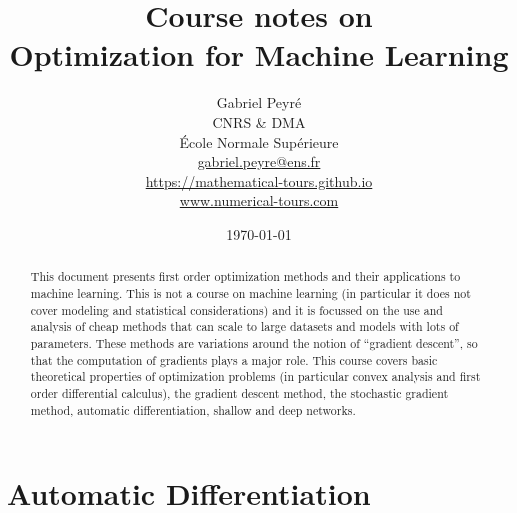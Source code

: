 \documentclass[10pt]{article}
\title{Course notes on\\Optimization for Machine Learning}
\author{%
\begin{tabular}{c}
	Gabriel Peyr{\'e} \\ CNRS \& DMA \\
	 \'Ecole Normale Sup\'erieure \\
	 \url{gabriel.peyre@ens.fr}\\
	 \url{https://mathematical-tours.github.io}\\
	 \url{www.numerical-tours.com}
\end{tabular}
}
\date{\today}
\begin{document}
\maketitle

\begin{abstract}
		This document presents first order optimization methods and their applications to machine learning. 
		This is not a course on machine learning (in particular it does not cover modeling and statistical considerations) and it is focussed on the use and analysis of cheap methods that can scale to large datasets and models with lots of parameters. These methods are variations around the notion of ``gradient descent'', so that the computation of gradients plays a major role.
		This course covers basic theoretical properties of optimization problems (in particular convex analysis and first order differential calculus), the gradient descent method, the stochastic gradient method, automatic differentiation, shallow and deep networks.  
\end{abstract}

\tableofcontents

 





% 

\section{Automatic Differentiation}



% 






\end{document}
